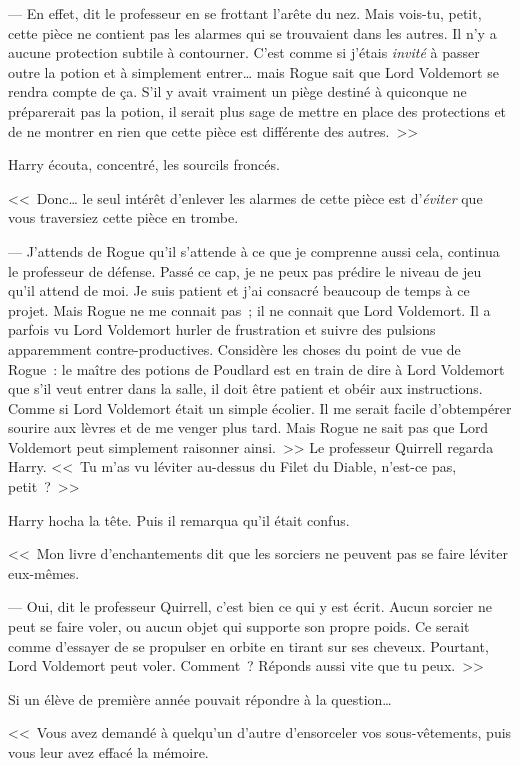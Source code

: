 --- En effet, dit le professeur en se frottant l'arête du nez. Mais vois-tu, petit, cette pièce ne contient pas les alarmes qui se trouvaient dans les autres. Il n'y a aucune protection subtile à contourner. C'est comme si j'étais \emph{invité} à passer outre la potion et à simplement entrer… mais Rogue sait que Lord Voldemort se rendra compte de ça. S'il y avait vraiment un piège destiné à quiconque ne préparerait pas la potion, il serait plus sage de mettre en place des protections et de ne montrer en rien que cette pièce est différente des autres.~>>

Harry écouta, concentré, les sourcils froncés.

<<~Donc… le seul intérêt d'enlever les alarmes de cette pièce est d'\emph{éviter} que vous traversiez cette pièce en trombe.

--- J'attends de Rogue qu'il s'attende à ce que je comprenne aussi cela, continua le professeur de défense. Passé ce cap, je ne peux pas prédire le niveau de jeu qu'il attend de moi. Je suis patient et j'ai consacré beaucoup de temps à ce projet. Mais Rogue ne me connait pas~; il ne connait que Lord Voldemort. Il a parfois vu Lord Voldemort hurler de frustration et suivre des pulsions apparemment contre-productives. Considère les choses du point de vue de Rogue~: le maître des potions de Poudlard est en train de dire à Lord Voldemort que s'il veut entrer dans la salle, il doit être patient et obéir aux instructions. Comme si Lord Voldemort était un simple écolier. Il me serait facile d'obtempérer sourire aux lèvres et de me venger plus tard. Mais Rogue ne sait pas que Lord Voldemort peut simplement raisonner ainsi.~>> Le professeur Quirrell regarda Harry. <<~Tu m'as vu léviter au-dessus du Filet du Diable, n'est-ce pas, petit~?~>>

Harry hocha la tête. Puis il remarqua qu'il était confus.

<<~Mon livre d'enchantements dit que les sorciers ne peuvent pas se faire léviter eux-mêmes.

--- Oui, dit le professeur Quirrell, c'est bien ce qui y est écrit. Aucun sorcier ne peut se faire voler, ou aucun objet qui supporte son propre poids. Ce serait comme d'essayer de se propulser en orbite en tirant sur ses cheveux. Pourtant, Lord Voldemort peut voler. Comment~? Réponds aussi vite que tu peux.~>>

Si un élève de première année pouvait répondre à la question…

<<~Vous avez demandé à quelqu'un d'autre d'ensorceler vos sous-vêtements, puis vous leur avez effacé la mémoire.

